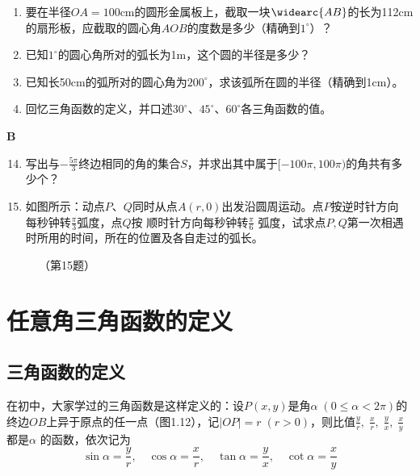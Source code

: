 \begin{enumerate}
\item 要在半径$OA=100$cm的圆形金属板上，截取一块$\widearc{AB}$的长为112cm的扇形板，应截取的圆心角$AOB$的度数是多少（精确到$1^{\circ}$）？
\item 已知$1^{\circ}$的圆心角所对的弧长为1m，这个圆的半径是多少？
\item 已知长50cm的弧所对的圆心角为$200^{\circ}$，求该弧所在圆的半径（精确到1cm）。
\item 回忆三角函数的定义，并口述$30^{\circ}$、$45^{\circ}$、$60^{\circ}$各三角函数的值。
\end{enumerate}

\begin{center}
    \bfseries B
\end{center}

\begin{enumerate}\setcounter{enumi}{13}
    \item 写出与$-\frac{5\pi}{3}$终边相同的角的集合$S$，并求出其中属于$[-100\pi, 100\pi)$的角共有多少个？
 \item    如图所示：动点$P$、$Q$同时从点$A(r,0)$出发沿圆周运动。点$P$按逆时针方向
    每秒钟转$\frac{\pi}{3}$弧度，点$Q$按
    顺时针方向每秒钟转$\frac{\pi}{6}$
    弧度，试求点$P,Q$第一次相遇时所用的时间，所在的位置及各自走过的弧长。
\end{enumerate}

\begin{figure}[htp]
    \centering
{}
    \caption*{（第15题）}
\end{figure}

\section{任意角三角函数的定义}

\subsection{三角函数的定义}
在初中，大家学过的三角函数是这样定义的：设$P(x,y)$是角$\alpha\; (0\le \alpha<2\pi)$的终边$OB$上异于原点的任一点（图1.12），记$|OP|=r\; (r>0)$，则比值$\frac{y}{r},\; \frac{x}{r},\; \frac{y}{x},\; \frac{x}{y}$都是$\alpha$
的函数，依次记为
\[\sin\alpha=\frac{y}{r},\quad \cos\alpha=\frac{x}{r},\quad \tan\alpha=\frac{y}{x},\quad \cot\alpha=\frac{x}{y}\]


